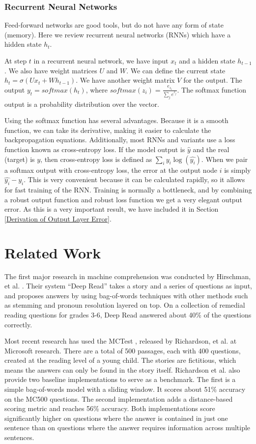 \documentclass[pageno]{final_paper}
\begin{document}
\subsubsection{Recurrent Neural Networks}
\label{Recurrent Neural Networks}

Feed-forward networks are good tools, but do not have any form of state
(memory). Here we review recurrent neural networks (RNNs) which have a hidden
state $h_t$.

At step $t$ in a recurrent neural network, we have input $x_t$ and a hidden
state $h_{t-1}$. We also have weight matrices $U$ and $W$. We can define the
current state $h_t = \sigma(Ux_t + Wh_{t-1})$. We have another weight matrix $V$
for the output. The output $y_t = softmax(h_t)$, where $softmax(z_i) =
\frac{e_{z_i}}{\sum_j e^{z_j}}$. The softmax function output is a probability
distribution over the vector.

Using the softmax function has several advantages. Because it is a smooth
function, we can take its derivative, making it easier to calculate the
backpropagation equations. Additionally, most RNNs and variants use a loss
function known as cross-entropy loss. If the model output is $\hat{y}$ and the
real (target) is $y$, then cross-entropy loss is defined as $\sum_i y_i
\log(\hat{y_{i}})$. When we pair a softmax output with cross-entropy loss, the
error at the output node $i$ is simply $\hat{y_i} - y_i$. This is very
convenient because it can be calculated rapidly, so it allows for fast training
of the RNN. Training is normally a bottleneck, and by combining a robust output
function and robust loss function we get a very elegant output error. As this is
a very important result, we have included it in Section \ref{Derivation of
Output Layer Error}.

\section{Related Work}
\label{Related Work}

The first major research in machine comprehension was conducted by Hirschman, et
al. \cite{Hirschman1999}. Their system ``Deep Read'' takes a story and a series
of questions as input, and proposes answers by using bag-of-words techniques
with other methods such as stemming and pronoun resolution layered on top. On a
collection of remedial reading questions for grades 3-6, Deep Read answered
about 40\% of the questions correctly.

Most recent research has used the MCTest \cite{Richardson2013}, released by
Richardson, et al. at Microsoft research. There are a total of 500 passages,
each with 400 questions, created at the reading level of a young child. The
stories are fictitious, which means the answers can only be found in the story
itself. Richardson et al. also provide two baseline implementations to serve as
a benchmark. The first is a simple bag-of-words model with a sliding window. It
scores about 51\% accuracy on the MC500 questions. The second implementation
adds a distance-based scoring metric and reaches 56\% accuracy. Both
implementations score significantly higher on questions where the answer is
contained in just one sentence than on questions where the answer requires
information across multiple sentences.
\end{document}
